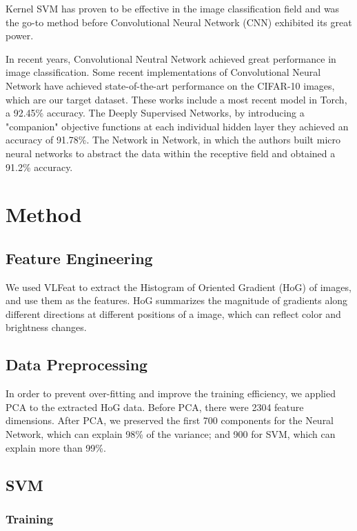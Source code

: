 \documentclass{article} %
\begin{document}
Kernel SVM has proven to be effective in the image classification field\cite{chapelle1999support} and was the go-to method before Convolutional Neural Network (CNN) exhibited its great power.

In recent years, Convolutional Neutral Network achieved great performance in image classification. Some recent implementations of Convolutional Neural Network have achieved state-of-the-art performance on the CIFAR-10 images, which are our target dataset. These works include a most recent model in Torch\cite{torch}, a 92.45\% accuracy. The Deeply Supervised Networks\cite{lee2014deeply}, by introducing a "companion" objective functions at each individual hidden layer they achieved an accuracy of 91.78\%. The Network in Network\cite{minlin2014network}, in which the authors built micro neural networks to abstract the data within the receptive field and obtained a 91.2\% accuracy.


\section{Method}

\subsection{Feature Engineering}

We used VLFeat to extract the Histogram of Oriented Gradient (HoG) of images, and use them as the features. HoG summarizes the magnitude of gradients along different directions at different positions of a image, which can reflect color and brightness changes.

\subsection{Data Preprocessing}
In order to prevent over-fitting and improve the training efficiency, we applied PCA to the extracted HoG data. Before PCA, there were 2304 feature dimensions. After PCA, we preserved the first 700 components for the Neural Network, which can explain 98\% of the variance; and 900 for SVM, which can explain more than 99\%.

\subsection{SVM}

\subsubsection{Training}
\end{document}
